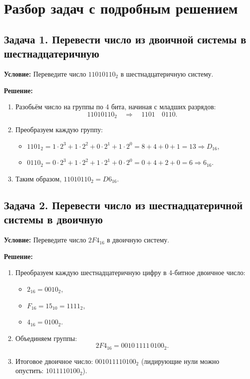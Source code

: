 \documentclass[12pt,a4paper]{article}
\begin{document}
\section{Разбор задач с подробным решением}

\subsection{Задача 1. Перевести число из двоичной системы в шестнадцатеричную}
\textbf{Условие:} Переведите число \(11010110_2\) в шестнадцатеричную систему.

\textbf{Решение:}
\begin{enumerate}
    \item Разобьём число на группы по 4 бита, начиная с младших разрядов:
    \[
    11010110_2 \quad \Rightarrow \quad 1101 \quad 0110.
    \]
    \item Преобразуем каждую группу:
    \begin{itemize}
        \item \(1101_2 = 1\cdot2^3+1\cdot2^2+0\cdot2^1+1\cdot2^0 = 8+4+0+1 = 13 \Rightarrow D_{16}\),
        \item \(0110_2 = 0\cdot2^3+1\cdot2^2+1\cdot2^1+0\cdot2^0 = 0+4+2+0 = 6 \Rightarrow 6_{16}\).
    \end{itemize}
    \item Таким образом, \(11010110_2 = D6_{16}\).
\end{enumerate}

\subsection{Задача 2. Перевести число из шестнадцатеричной системы в двоичную}
\textbf{Условие:} Переведите число \(2F4_{16}\) в двоичную систему.

\textbf{Решение:}
\begin{enumerate}
    \item Преобразуем каждую шестнадцатеричную цифру в 4-битное двоичное число:
    \begin{itemize}
        \item \(2_{16} = 0010_2\),
        \item \(F_{16} = 15_{10} = 1111_2\),
        \item \(4_{16} = 0100_2\).
    \end{itemize}
    \item Объединяем группы:
    \[
    2F4_{16} = 0010\,1111\,0100_2.
    \]
    \item Итоговое двоичное число: \(001011110100_2\) (лидирующие нули можно опустить: \(1011110100_2\)).
\end{enumerate}
\end{document}
